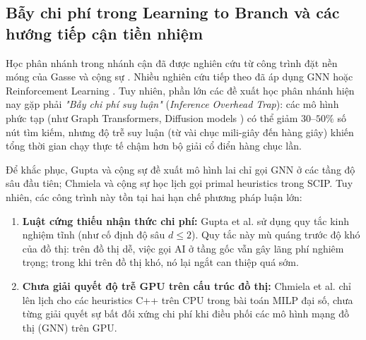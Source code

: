 \documentclass[11pt,a4paper]{article}
\begin{document}
\subsection{Bẫy chi phí trong Learning to Branch và các hướng tiếp cận tiền nhiệm}
Học phân nhánh trong nhánh cận đã được nghiên cứu từ công trình đặt nền móng của Gasse và cộng sự \citep{gasse2019}. Nhiều nghiên cứu tiếp theo đã áp dụng GNN hoặc Reinforcement Learning \citep{zhang2022branching, kuang2024gs4co, min2025ordering, fang2026asap}. Tuy nhiên, phần lớn các đề xuất học phân nhánh hiện nay gặp phải \textit{"Bẫy chi phí suy luận"} (\textit{Inference Overhead Trap}): các mô hình phức tạp (như Graph Transformers, Diffusion models \citep{fang2026asap}) có thể giảm $30\text{--}50\%$ số nút tìm kiếm, nhưng độ trễ suy luận (từ vài chục mili-giây đến hàng giây) khiến tổng thời gian chạy thực tế chậm hơn bộ giải cổ điển hàng chục lần.

Để khắc phục, Gupta và cộng sự \citep{gupta2020} đề xuất mô hình lai chỉ gọi GNN ở các tầng độ sâu đầu tiên; Chmiela và cộng sự \citep{chmiela2021} học lịch gọi primal heuristics trong SCIP. Tuy nhiên, các công trình này tồn tại hai hạn chế phương pháp luận lớn:
\begin{enumerate}[leftmargin=*]
    \item \textbf{Luật cứng thiếu nhận thức chi phí:} Gupta et al. sử dụng quy tắc kinh nghiệm tĩnh (như cố định độ sâu $d \le 2$). Quy tắc này mù quáng trước độ khó của đồ thị: trên đồ thị dễ, việc gọi AI ở tầng gốc vẫn gây lãng phí nghiêm trọng; trong khi trên đồ thị khó, nó lại ngắt can thiệp quá sớm.
    \item \textbf{Chưa giải quyết độ trễ GPU trên cấu trúc đồ thị:} Chmiela et al. chỉ lên lịch cho các heuristics C++ trên CPU trong bài toán MILP đại số, chưa từng giải quyết sự bất đối xứng chi phí khi điều phối các mô hình mạng đồ thị (GNN) trên GPU.
\end{enumerate}
\end{document}
